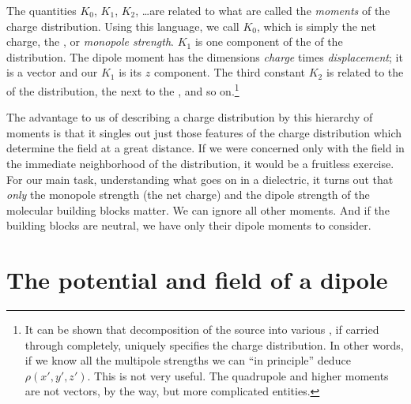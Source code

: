 The quantities $K_0$, $K_1$, $K_2$, \ldots are related to what are called the
\emph{moments} of the charge distribution. Using this language, we call $K_0$,
which is simply the net charge, the , or \emph{monopole
strength}. $K_1$ is one component of the  of the 
distribution. The dipole moment has the dimensions \emph{charge} times 
\emph{displacement}; it is a vector and our $K_1$ is its $z$ component. The third
constant $K_2$ is related to the  of the distribution,
the next to the , and
so on.\footnote{It can be shown that decomposition of the source into various , if carried
through completely, uniquely specifies the charge distribution. In other words, if we
know all the multipole strengths we can ``in principle'' deduce $\rho(x',y',z')$. This is not
very useful. The quadrupole and higher moments are not vectors, by the way, but
more complicated entities.}

The advantage to us of describing a charge distribution by this
hierarchy of moments is that it singles out just those features of the
charge distribution which determine the field at a great distance. If
we were concerned only with the field in the immediate neighborhood
of the distribution, it would be a fruitless exercise. For our main task,
understanding what goes on in a dielectric, it turns out that \emph{only} the
monopole strength (the net charge) and the dipole strength of the
molecular building blocks matter. We can ignore all other moments.
And if the building blocks are neutral, we have only their dipole
moments to consider.

\section{The potential and field of a dipole}

